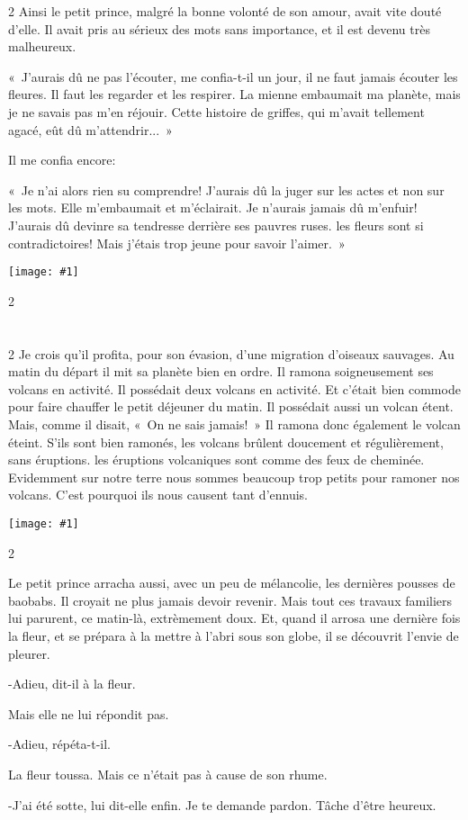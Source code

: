 \documentclass{report}
\newcommand{\parachapter}[2][]{\end{paracol}\chapter[#1]{#2}\begin{paracol}{2}}
\newcommand{\incpic}[1]{%
\end{paracol}
\begin{center}
    \texttt{[image: \#1]}
\end{center}
\begin{paracol}{2}}
\begin{document}
\begin{paracol}{2}
Ainsi le petit prince, malgré la bonne volonté de son amour, avait vite douté d'elle. Il avait pris au sérieux des mots sans importance, et il est devenu très malheureux.

«~J'aurais dû ne pas l'écouter, me confia-t-il un jour, il ne faut jamais écouter les fleures. Il faut les regarder et les respirer. La mienne embaumait ma planète, mais je ne savais pas m'en réjouir. Cette histoire de griffes, qui m'avait tellement agacé, eût dû m'attendrir...~»

Il me confia encore:

«~Je n'ai alors rien su comprendre! J'aurais dû la juger sur les actes et non sur les mots. Elle m'embaumait et m'éclairait. Je n'aurais jamais dû m'enfuir! J'aurais dû devinre sa tendresse derrière ses pauvres ruses. les fleurs sont si contradictoires! Mais j'étais trop jeune pour savoir l'aimer.~»
\incpic{pic/image22.jpeg}

\parachapter[IX]{} %
Je crois qu'il profita, pour son évasion, d'une migration d'oiseaux sauvages. Au matin du départ il mit sa planète bien en ordre. Il ramona soigneusement ses volcans en activité. Il possédait deux volcans en activité. Et c'était bien commode pour faire chauffer le petit déjeuner du matin. Il possédait aussi un volcan étent. Mais, comme il disait, «~On ne sais jamais!~» Il ramona donc également le volcan éteint. S'ils sont bien ramonés, les volcans brûlent doucement et régulièrement, sans éruptions. les éruptions volcaniques sont comme des feux de cheminée. Evidemment sur notre terre nous sommes beaucoup trop petits pour ramoner nos volcans. C'est pourquoi ils nous causent tant d'ennuis. 

\incpic{pic/image23.jpeg}

Le petit prince arracha aussi, avec un peu de mélancolie, les dernières pousses de baobabs. Il croyait ne plus jamais devoir revenir. Mais tout ces travaux familiers lui parurent, ce matin-là, extrèmement doux. Et, quand il arrosa une dernière fois la fleur, et se prépara à la mettre à l'abri sous son globe, il se découvrit l'envie de pleurer.

-Adieu, dit-il à la fleur.

Mais elle ne lui répondit pas.

-Adieu, répéta-t-il.

La fleur toussa. Mais ce n'était pas à cause de son rhume.

-J'ai été sotte, lui dit-elle enfin. Je te demande pardon. Tâche d'être heureux.


\end{paracol}
\end{document}

